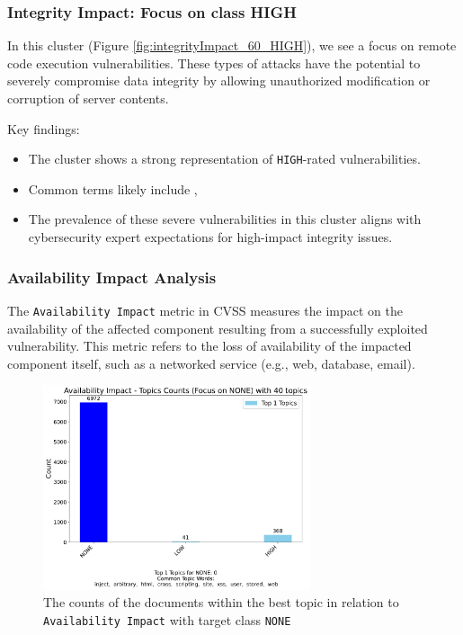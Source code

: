 \documentclass[12pt]{article}
\begin{document}
\subsubsection{Integrity Impact: Focus on class HIGH}

In this cluster (Figure \ref{fig:integrityImpact_60_HIGH}), we see a focus on remote code execution vulnerabilities. These
types of attacks have the potential to severely compromise data integrity by allowing unauthorized
modification or corruption of server contents.

Key findings:
\begin{itemize}

	\item The cluster shows a strong representation of \texttt{HIGH}-rated vulnerabilities.

	\item Common terms likely include , 

	\item The prevalence of these severe vulnerabilities in this cluster aligns with cybersecurity
	      expert expectations for high-impact integrity issues.

\end{itemize}

\subsubsection{Availability Impact Analysis}

The \texttt{Availability Impact} metric in CVSS measures the impact on the availability of the
affected component resulting from a successfully exploited vulnerability. This metric refers to the
loss of availability of the impacted component itself, such as a networked service (e.g., web,
database, email).

\begin{figure}[H]
	\centering
	\includegraphics[width=0.7\textwidth]{figures/availabilityImpact/merged_top_k_topics_category_focus_counts_availabilityImpact_NONE_k1.pdf}

	\caption{The counts of the documents within the best topic in relation to \texttt{Availability Impact} with target class \texttt{NONE}}

	\label{fig:availabilityImpact_60_NONE}
\end{figure}
\end{document}
